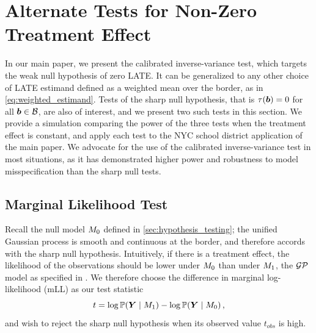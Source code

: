 \section{Alternate Tests for Non-Zero Treatment Effect}
\label{sec:alternate_tests}

    In our main paper, we present the calibrated inverse-variance test, which targets the weak null hypothesis of zero LATE.
It can be generalized to any other choice of LATE estimand defined as a weighted mean over the border, as in \autoref{eq:weighted_estimand}.
Tests of the sharp null hypothesis, that is \(\tau(\bm{b})=0\) for all \(\bm{b} \in \mathcal{B}\), are also of interest, and we present two such tests in this section.
We provide a simulation comparing the power of the three tests when the treatment effect is constant, and apply each test to the NYC school district application of the main paper.
We advocate for the use of the calibrated inverse-variance test in most situations, as it has demonstrated higher power and robustness to model misspecification than the sharp null tests.

\subsection{Marginal Likelihood Test}

    Recall the null model \(M_0\) defined in \autoref{sec:hypothesis_testing}; the unified Gaussian process is smooth and continuous at the border, and therefore accords with the sharp null hypothesis.
Intuitively, if there is a treatment effect, the likelihood of the observations should be lower under \(M_0\) than under \(M_1\),
the \(\operatorname{\mathcal{GP}}\) model as specified in .
We therefore choose the difference in marginal log-likelihood (mLL) as our test statistic
\begin{equation}
    t = \log \Pr\del{\Yvec \mid \modalt} - \log \Pr\del{\Yvec \mid \modnull} \,,
\end{equation}
and wish to reject the sharp null hypothesis when its observed value \(t_{obs}\) is high.

